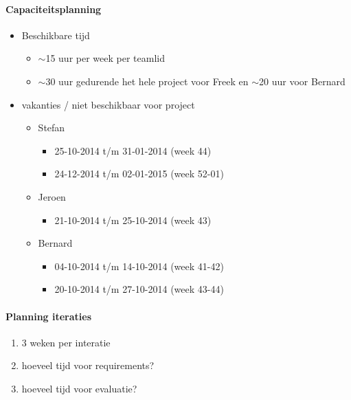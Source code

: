 \paragraph{Capaciteitsplanning}

\begin{itemize}
 \item Beschikbare tijd
 \begin{itemize}
  \item $\sim$15 uur per week per teamlid
  \item $\sim$30 uur gedurende het hele project voor Freek en $\sim$20 uur voor Bernard
 \end{itemize}

 
 
 \item vakanties / niet beschikbaar voor project
 \begin{itemize}
  
  \item Stefan
  \begin{itemize}
   \item 25-10-2014 t/m 31-01-2014 (week 44)
   \item 24-12-2014 t/m 02-01-2015 (week 52-01)
  \end{itemize}
 
  \item Jeroen
  \begin{itemize}
   \item 21-10-2014 t/m 25-10-2014 (week 43)
  \end{itemize}
 
  \item Bernard
   \begin{itemize}
    \item 04-10-2014 t/m 14-10-2014 (week 41-42)
    \item 20-10-2014 t/m 27-10-2014 (week 43-44)
   \end{itemize}

 \end{itemize}
\end{itemize}

\paragraph{Planning iteraties}
\begin{enumerate}
 \item 3 weken per interatie
 \item hoeveel tijd voor requirements?
 \item hoeveel tijd voor evaluatie?
\end{enumerate}